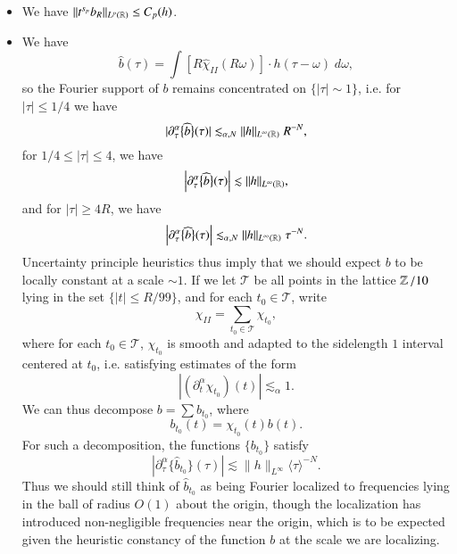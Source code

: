 \begin{itemize}
    \item We have $\| t^{s_p} b_R \|_{L^p(\operatorname{\mathbb{R}})} \leq C_p(h)$.

    \item We have
    \[ \widehat{b}(\tau) = \int [R\widehat{\chi}_{II}(R \omega)] \cdot h \left( \tau - \omega \right)\; d\omega, \]
    so the Fourier support of $b$ remains concentrated on $\{ |\tau| \sim 1 \}$, i.e. for $|\tau| \leq 1/4$ we have
    \[ |\partial_\tau^\alpha \big\{ \widehat{b} \big\}(\tau)| \lesssim_{\alpha,N} \| h \|_{L^\infty(\operatorname{\mathbb{R}})}\; R^{-N}, \]
    for $1/4 \leq |\tau| \leq 4$, we have
    \[ \left| \partial_\tau^\alpha \big\{ \widehat{b} \big\}(\tau) \right| \lesssim \| h \|_{L^\infty(\operatorname{\mathbb{R}})}, \]
    and for $|\tau| \geq 4R$, we have
    \[ \Big| \partial_\tau^\alpha \big\{ \widehat{b} \big\} (\tau) \Big| \lesssim_{\alpha,N} \| h \|_{L^\infty(\operatorname{\mathbb{R}})}\; \tau^{-N}. \]
    Uncertainty principle heuristics thus imply that we should expect $b$ to be locally constant at a scale $\sim 1$. If we let $\mathcal{T}$ be all points in the lattice $\operatorname{\mathbb{Z}} / 10$ lying in the set $\{ |t| \leq R / 99 \}$, and for each $t_0 \in \mathcal{T}$, write
    \[ \chi_{II} = \sum_{t_0 \in \mathcal{T}} \chi_{t_0}, \]
    where for each $t_0 \in \mathcal{T}$, $\chi_{t_0}$ is smooth and adapted to the sidelength $1$ interval centered at $t_0$, i.e. satisfying estimates of the form
    \[ | (\partial_t^\alpha \chi_{t_0})(t) | \lesssim_\alpha 1. \]
    We can thus decompose $b = \sum b_{t_0}$, where
    \[ b_{t_0}(t) = \chi_{t_0}(t) b(t). \]
    For such a decomposition, the functions $\{ b_{t_0} \}$ satisfy
    \[ | \partial_\tau^\alpha \{ \widehat{b}_{t_0} \}(\tau) | \lesssim \| h \|_{L^\infty} \langle \tau \rangle^{-N}. \]
    Thus we should still think of $\widehat{b}_{t_0}$ as being Fourier localized to frequencies lying in the ball of radius $O(1)$ about the origin, though the localization has introduced non-negligible frequencies near the origin, which is to be expected given the heuristic constancy of the function $b$ at the scale we are localizing.
\end{itemize}

